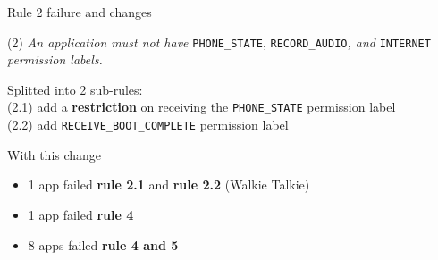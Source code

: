 \begin{frame}{Rule 2 failure and changes}

\vspace*{-0.5cm}

\fontsize{13pt}{0}\selectfont

(2) \textit{An application must not have} \texttt{PHONE\_STATE},
\texttt{RECORD\_AUDIO}\textit{, and }\texttt{INTERNET} \textit{permission
labels.}\\

\vspace*{0.5cm}

Splitted into 2 sub-rules:\\
\hspace*{0.1cm}(2.1) add a \textbf{restriction} on receiving the 
\texttt{PHONE\_STATE} \hspace*{1.1cm}permission label\\
\hspace*{0.1cm}(2.2) add \texttt{RECEIVE\_BOOT\_COMPLETE} permission label

\vspace*{0.8cm}

With this change
\begin{itemize}
  \item 1 app failed \textbf{rule 2.1} and \textbf{rule 2.2} 
  (Walkie Talkie)

  \item 1 app failed \textbf{rule 4}

  \item 8 apps failed \textbf{rule 4 and 5}
\end{itemize}

\end{frame}